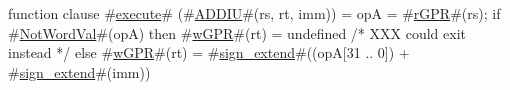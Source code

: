 function clause #\hyperref[zexecute]{execute}# (#\hyperref[zADDIU]{ADDIU}#(rs, rt, imm)) =
  {
    opA = #\hyperref[zrGPR]{rGPR}#(rs);
    if #\hyperref[zNotWordVal]{NotWordVal}#(opA) then
      #\hyperref[zwGPR]{wGPR}#(rt) = undefined /* XXX could exit instead */
    else
      #\hyperref[zwGPR]{wGPR}#(rt) = #\hyperref[zsignzyextend]{sign\_extend}#((opA[31 .. 0]) + #\hyperref[zsignzyextend]{sign\_extend}#(imm))
  }
